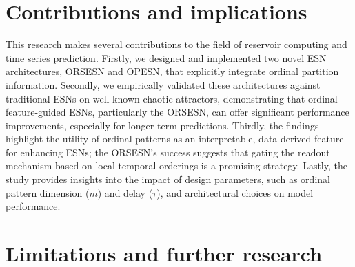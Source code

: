 
\section{Contributions and implications}

This research makes several contributions to the field of reservoir computing and time series prediction. Firstly, we designed and implemented two novel ESN architectures, ORSESN and OPESN, that explicitly integrate ordinal partition information. Secondly, we empirically validated these architectures against traditional ESNs on well-known chaotic attractors, demonstrating that ordinal-feature-guided ESNs, particularly the ORSESN, can offer significant performance improvements, especially for longer-term predictions. Thirdly, the findings highlight the utility of ordinal patterns as an interpretable, data-derived feature for enhancing ESNs; the ORSESN's success suggests that gating the readout mechanism based on local temporal orderings is a promising strategy. Lastly, the study provides insights into the impact of design parameters, such as ordinal pattern dimension ($m$) and delay ($\tau$), and architectural choices on model performance.

\section{Limitations and further research}

